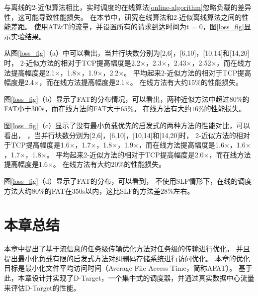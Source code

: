 与离线的2-近似算法相比，实时调度的在线算法\ref{online-algorithm}忽略负载的差异性，这可能导致性能损失。
在本节中，研究在线算法和2-近似离线算法之间的性能差距。
使用AT\&T的流量，并设置所有的请求到达时间为t = 0，图\ref{loss_fig}显示实验结果。

从图\ref{loss_fig}（a）中可以看出，当并行块数分别为[2,6]，[6,10]，[10,14]和[14,20]时，
2-近似方法的相对于TCP提高幅度是2.2$\times$，2.3$\times$，2.43$\times$，2.52$\times$，而在线方法提高幅度是2.1$\times$，1.8$\times$，1.9$\times$，2.2$\times$。
平均起来2-近似方法的相对于TCP提高幅度是2.4$\times$，而在线方法提高幅度是2.1$\times$。
在线方法有大约$15\%$的性能损失。

图\ref{loss_fig}（b）显示了FAT的分布情况，可以看出，两种近似方法中超过$80\%$的FAT小于300s，而在线方法的FAT大于$65\%$。
在线方法有大约$16\%$的性能损失。

图\ref{loss_fig}（c）显示了没有最小负载优先的启发式的两种方法的性能对比，可以看出，
，当并行块数分别为[2,6]，[6,10]，[10,14]和[14,20]时，
2-近似方法的相对于TCP提高幅度是1.6$\times$，1.7$\times$，1.8$\times$，1.9$\times$，而在线方法提高幅度是1.6$\times$，1.6$\times$，1.7$\times$，1.8$\times$。
平均起来2-近似方法的相对于TCP提高幅度是2.0$\times$，而在线方法提高幅度是1.6$\times$。
在线方法有大约$20\%$的性能损失。

图\ref{loss_fig}（d）显示了FAT的分布，可以看到，
不使用SLF情形下，在线的调度方法大约$80\%$的FAT在350s以内，这比SLF的方法差$28\%$左右。

\section{本章总结}
本章中提出了基于流信息的任务级传输优化方法对任务级的传输进行优化，
并且提出最小化负载有限的启发式方法对纠删码存储系统进行访问优化。 
本章的优化目标是最小化文件平均访问时间（Average File Access Time，简称AFAT）。 
基于此，本章设计并实现了D-Target，一个集中式的调度器，并通过真实数据中心流量来评估D-Target的性能。
